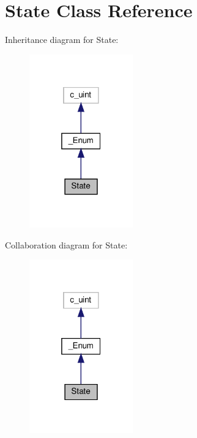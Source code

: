 \hypertarget{classvlc_1_1_state}{}\section{State Class Reference}
\label{classvlc_1_1_state}


Inheritance diagram for State\+:
\nopagebreak
\begin{figure}[H]
\begin{center}
\leavevmode
\includegraphics[width=127pt]{classvlc_1_1_state__inherit__graph}
\end{center}
\end{figure}


Collaboration diagram for State\+:
\nopagebreak
\begin{figure}[H]
\begin{center}
\leavevmode
\includegraphics[width=127pt]{classvlc_1_1_state__coll__graph}
\end{center}
\end{figure}

